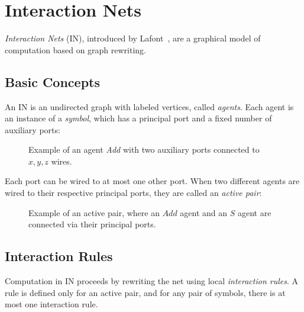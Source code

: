 \section{Interaction Nets}
\label{sec:interaction-nets}

\textit{Interaction Nets} (IN), introduced by Lafont~\cite{lafont1990interactionnets}, are a
graphical model of computation based on graph rewriting.

\subsection{Basic Concepts}
An IN is an undirected graph with labeled vertices, called \textit{agents}. Each agent
is an instance of a \textit{symbol}, which has a principal port and a fixed number of auxiliary ports:
\begin{figure}[H]
	\centering
	\caption{Example of an agent \textit{Add} with two auxiliary ports connected to $x, y, z$ wires.}
	\label{fig:agent}
\end{figure}

Each port can be wired to at most one other port. When two different agents are wired to their
respective principal ports, they are called an \textit{active pair}:

\begin{figure}[H]
	\centering
	\caption{Example of an active pair, where an $\mathit{Add}$ agent and an $\mathit{S}$ agent are connected via their principal ports.}
	\label{fig:active-pair}
\end{figure}

\subsection{Interaction Rules}
Computation in IN proceeds by rewriting the net using local \emph{interaction rules}. A rule
is defined only for an active pair, and for any pair of symbols, there is at most one
interaction rule.

